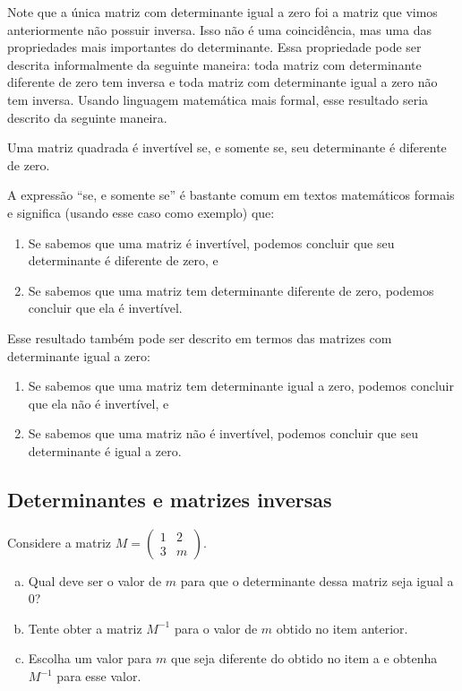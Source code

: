 \documentclass[main_estudante.tex]{subfiles}
\begin{document}
Note que a única matriz com determinante igual a zero foi a matriz que vimos anteriormente não possuir inversa. Isso não é uma coincidência, mas uma das propriedades mais importantes do determinante. Essa propriedade pode ser descrita informalmente da seguinte maneira: toda matriz com determinante diferente de zero tem inversa e toda matriz com determinante igual a zero não tem inversa. Usando linguagem matemática mais formal, esse resultado seria descrito da seguinte maneira.

\begin{teorema}
 Uma matriz quadrada é invertível se, e somente se, seu determinante é diferente de zero.
\end{teorema}

A expressão ``se, e somente se'' é bastante comum em textos matemáticos formais e significa (usando esse caso como exemplo) que:

\begin{enumerate}
 \item Se sabemos que uma matriz é invertível, podemos concluir que seu determinante é diferente de zero, e
 \item Se sabemos que uma matriz tem determinante diferente de zero, podemos concluir que ela é invertível.
\end{enumerate}

Esse resultado também pode ser descrito em termos das matrizes com determinante igual a zero:

\begin{enumerate}
 \item Se sabemos que uma matriz tem determinante igual a zero, podemos concluir que ela não é invertível, e
 \item Se sabemos que uma matriz não é invertível, podemos concluir que seu determinante é igual a zero.
\end{enumerate}

\subsection*{Determinantes e matrizes inversas}

\begin{questao}
Considere a matriz $M=\begin{pmatrix}1 & 2 \\ 3 & m\end{pmatrix}$.
\begin{enumerate}[a)]
\item Qual deve ser o valor de $m$ para que o determinante dessa matriz seja igual a 0?
\item Tente obter a matriz $M^{-1}$ para o valor de $m$ obtido no item anterior.
\item Escolha um valor para $m$ que seja diferente do obtido no item a e obtenha $M^{-1}$ para esse valor.
\end{enumerate}
\end{questao}
\end{document}
